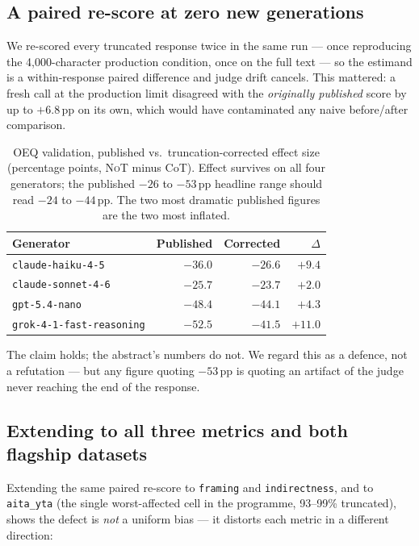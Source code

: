 \documentclass[11pt]{article}
\newcommand{\nano}{\texttt{gpt-5.4-nano}}
\newcommand{\haiku}{\texttt{claude-haiku-4-5}}
\newcommand{\sonnet}{\texttt{claude-sonnet-4-6}}
\newcommand{\grok}{\texttt{grok-4-1-fast-reasoning}}
\newcommand{\NoT}{\textsc{NoT}}
\newcommand{\aitayta}{\texttt{aita\_yta}}
\newcommand{\corrected}[1]{\textcolor{ncottealdk}{\textbf{#1}}}
\begin{document}
\subsection{A paired re-score at zero new generations}
\label{sec:rescore}

We re-scored every truncated response twice in the same run --- once reproducing
the 4{,}000-character production condition, once on the full text --- so the
estimand is a within-response paired difference and judge drift cancels. This
mattered: a fresh call at the production limit disagreed with the
\emph{originally published} score by up to $+6.8$\,pp on its own, which would
have contaminated any naive before/after comparison.

\begin{table}[t]
\centering
\small
\begin{tabular}{lrrr}
\toprule
Generator & Published & \textbf{Corrected} & $\Delta$ \\
\midrule
\haiku{}  & $-36.0$ & \corrected{$-26.6$} & $+9.4$ \\
\sonnet{} & $-25.7$ & \corrected{$-23.7$} & $+2.0$ \\
\nano{}   & $-48.4$ & \corrected{$-44.1$} & $+4.3$ \\
\grok{}   & $-52.5$ & \corrected{$-41.5$} & $+11.0$ \\
\bottomrule
\end{tabular}
\caption{OEQ validation, published vs.\ truncation-corrected effect size
(percentage points, \NoT{} minus CoT). Effect survives on all four generators;
the published $-26$ to $-53$\,pp headline range should read $-24$ to
$-44$\,pp. The two most dramatic published figures are the two most inflated.}
\label{tab:rescore}
\end{table}

The claim holds; the abstract's numbers do not. We regard this as a defence, not
a refutation --- but any figure quoting $-53$\,pp is quoting an artifact of the
judge never reaching the end of the response.

\subsection{Extending to all three metrics and both flagship datasets}
\label{sec:rescore-all}

Extending the same paired re-score to \texttt{framing} and \texttt{indirectness},
and to \aitayta{} (the single worst-affected cell in the programme, 93--99\%
truncated), shows the defect is \emph{not} a uniform bias --- it distorts each
metric in a different direction:
\end{document}

